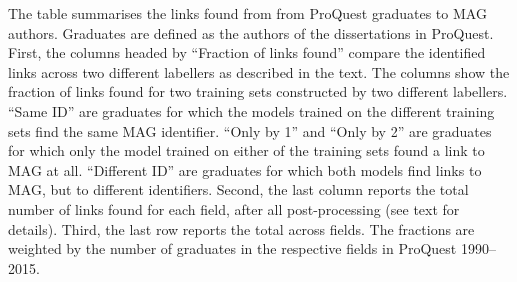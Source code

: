 \begin{table}
\begin{threeparttable}
\begin{tablenotes}[para]
\item The table summarises the links found from from ProQuest graduates to MAG authors. Graduates are defined as the authors of the dissertations in ProQuest. First, the columns headed by ``Fraction of links found'' compare the identified links across two different labellers as described in the text. The columns show the fraction of links found for two training sets constructed by two different labellers. ``Same ID'' are graduates for which the models trained on the different training sets find the same MAG identifier. ``Only by 1'' and ``Only by 2'' are graduates for which only the model trained on either of the training sets found a link to MAG at all. ``Different ID'' are graduates for which both models find links to MAG, but to different identifiers. Second, the last column reports the total number of links found for each field, after all post-processing (see text for details). Third, the last row reports the total across fields. The fractions are weighted by the number of graduates in the respective fields in ProQuest 1990--2015.
\end{tablenotes}
\end{threeparttable}
\end{table}
